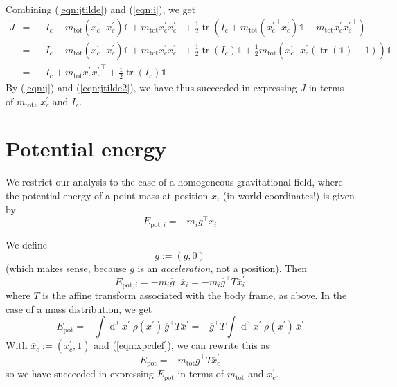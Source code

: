 \documentclass[a4paper]{article}
\begin{document}
Combining (\ref{eqn:jtilde}) and (\ref{eqn:i}), we get
\begin{eqnarray}
\label{eqn:jtilde2}
\nonumber \tilde{J} &=& -I_c - m_\mathrm{tot}({x_c^\prime}^\top x_c^\prime) \mathbb{1} + m_\mathrm{tot} x_c^\prime {x_c^\prime}^\top
+ \frac{1}{2} \operatorname{tr}\left(I_c + m_\mathrm{tot} ({x_c^\prime}^\top x_c^\prime) \mathbb{1} - m_\mathrm{tot} x_c^\prime {x_c^\prime}^\top\right)\\
\nonumber &=& -I_c - m_\mathrm{tot} ({x_c^\prime}^\top x_c^\prime) \mathbb{1} + m_\mathrm{tot} x_c^\prime {x_c^\prime}^\top + \frac{1}{2} \operatorname{tr}\left(I_c\right) \mathbb{1} + \frac{1}{2} m_\mathrm{tot} \left({x_c^\prime}^\top x_c^\prime (\operatorname{tr}(\mathbb{1}) - 1)\right) \mathbb{1}\\
&=& -I_c + m_\mathrm{tot} x_c^\prime {x_c^\prime}^\top + \frac{1}{2} \operatorname{tr}\left(I_c\right) \mathbb{1}
\end{eqnarray}
By (\ref{eqn:j}) and (\ref{eqn:jtilde2}), we have thus succeeded in expressing $J$ in terms of $m_\mathrm{tot}$, $x_c^\prime$ and $I_c$.

\section{Potential energy}
We restrict our analysis to the case of a homogeneous gravitational field, where the potential energy of a point mass at position $x_i$ (in world coordinates!) is given by
\begin{equation}
E_{\mathrm{pot},i} = - m_i g^\top x_i
\end{equation}

We define
\begin{equation}
\overline{g} := (g, 0)
\end{equation}
(which makes sense, because $g$ is an \emph{acceleration}, not a position). Then
\begin{equation}
E_{\mathrm{pot},i} = - m_i \overline{g}^\top \overline{x}_i
= - m_i \overline{g}^\top T \overline{x}^\prime_i
\end{equation}
where $T$ is the affine transform associated with the body frame, as above. In the case of a mass distribution, we get
\begin{equation}
E_\mathrm{pot} = -\int\operatorname{d}^3\!x^\prime\; \rho(x^\prime)\, \overline{g}^\top T \overline{x}^\prime
= -\overline{g}^\top T \int\operatorname{d}^3\!x^\prime\; \rho(x^\prime)\, \overline{x}^\prime
\end{equation}
With $\overline{x}_c^\prime := (x_c^\prime, 1)$ and (\ref{eqn:xpcdef}), we can rewrite this as
\begin{equation}
\label{eqn:epot}
E_\mathrm{pot} = - m_\mathrm{tot} \overline{g}^\top T \overline{x}_c^\prime
\end{equation}
so we have succeeded in expressing $E_\mathrm{pot}$ in terms of $m_\mathrm{tot}$ and $x_c^\prime$.
\end{document}
